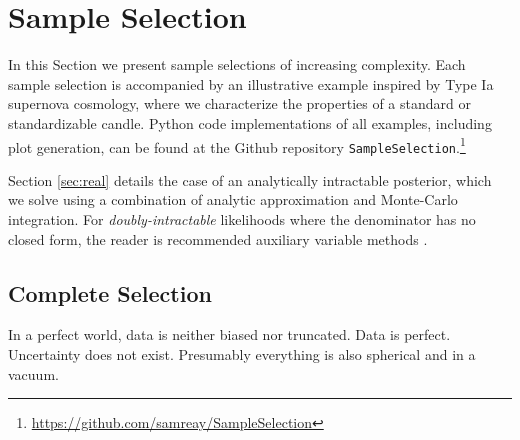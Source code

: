 \documentclass[a4paper,fleqn,usenatbib]{mnras}
\begin{document}
\section{Sample Selection}
\label{sec:examples}

In this Section we present sample selections of increasing complexity. Each sample selection is accompanied by an illustrative example inspired by Type Ia supernova cosmology, where we characterize the properties of a standard or standardizable candle. Python code implementations of all examples, including plot generation, can be found at the Github repository \verb|SampleSelection|.\footnote{\url{https://github.com/samreay/SampleSelection}}
 
Section \ref{sec:real} details the case of an analytically intractable posterior, which we solve using a combination of analytic approximation and Monte-Carlo integration. For \textit{doubly-intractable} likelihoods where the denominator has no closed form,  the reader is recommended auxiliary variable methods \citep{MollerPettitt2006, MurrayGhahramani2012, Liang2010}.
 
\subsection{Complete Selection}
\label{sec:perfect}
In a perfect world, data is neither biased nor truncated. Data is perfect. Uncertainty does not exist. Presumably everything is also spherical and in a vacuum.
\end{document}

